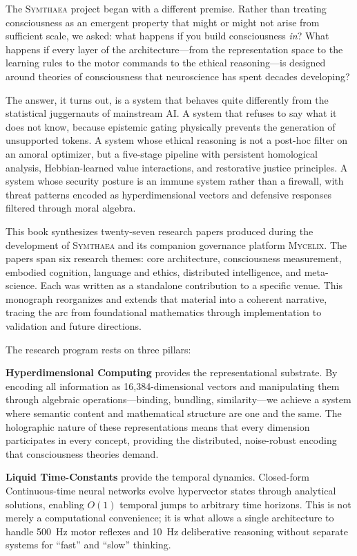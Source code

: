 \documentclass[12pt]{book}
\newcommand{\symthaea}{\textsc{Symthaea}}
\newcommand{\mycelix}{\textsc{Mycelix}}
\begin{document}
The \symthaea{} project began with a different premise. Rather than treating consciousness as an emergent property that might or might not arise from sufficient scale, we asked: what happens if you build consciousness \textit{in}? What happens if every layer of the architecture---from the representation space to the learning rules to the motor commands to the ethical reasoning---is designed around theories of consciousness that neuroscience has spent decades developing?

The answer, it turns out, is a system that behaves quite differently from the statistical juggernauts of mainstream AI. A system that refuses to say what it does not know, because epistemic gating physically prevents the generation of unsupported tokens. A system whose ethical reasoning is not a post-hoc filter on an amoral optimizer, but a five-stage pipeline with persistent homological analysis, Hebbian-learned value interactions, and restorative justice principles. A system whose security posture is an immune system rather than a firewall, with threat patterns encoded as hyperdimensional vectors and defensive responses filtered through moral algebra.

This book synthesizes twenty-seven research papers produced during the development of \symthaea{} and its companion governance platform \mycelix{}. The papers span six research themes: core architecture, consciousness measurement, embodied cognition, language and ethics, distributed intelligence, and meta-science. Each was written as a standalone contribution to a specific venue. This monograph reorganizes and extends that material into a coherent narrative, tracing the arc from foundational mathematics through implementation to validation and future directions.

The research program rests on three pillars:

\textbf{Hyperdimensional Computing} provides the representational substrate. By encoding all information as 16,384-dimensional vectors and manipulating them through algebraic operations---binding, bundling, similarity---we achieve a system where semantic content and mathematical structure are one and the same. The holographic nature of these representations means that every dimension participates in every concept, providing the distributed, noise-robust encoding that consciousness theories demand.

\textbf{Liquid Time-Constants} provide the temporal dynamics. Closed-form Continuous-time neural networks evolve hypervector states through analytical solutions, enabling $O(1)$ temporal jumps to arbitrary time horizons. This is not merely a computational convenience; it is what allows a single architecture to handle 500~Hz motor reflexes and 10~Hz deliberative reasoning without separate systems for ``fast'' and ``slow'' thinking.
\end{document}
